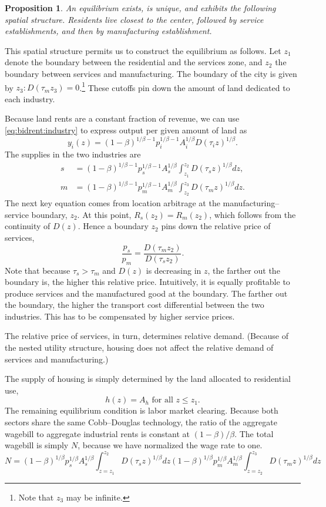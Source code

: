 \documentclass[12pt]{article}
\newtheorem{proposition}{Proposition}
\begin{document}
\begin{proposition}\label{prop:spatial}
An equilibrium exists, is unique, and exhibits the following spatial structure. Residents live closest to the center, followed by service establishments, and then by manufacturing establishment.
\end{proposition}

This spatial structure permits us to construct the equilibrium as follows. Let $z_1$ denote the boundary between the residential and the services zone, and $z_2$ the boundary between services and manufacturing. The boundary of the city is given by $z_3: D(\tau_m z_3)=0$.\footnote{Note that $z_3$ may be infinite.} These cutoffs pin down the amount of land dedicated to each industry.

Because land rents are a constant fraction of revenue, we can use \eqref{eq:bidrent:industry} to express output per given amount of land as
\[
y_i(z) = (1-\beta)^{1/\beta-1} p_i^{1/\beta-1} A_i^{1/\beta} D(\tau_i z)^{1/\beta}.
\]
The supplies in the two industries are
\begin{align}
s &= (1-\beta)^{1/\beta-1} p_s^{1/\beta-1} A_s^{1/\beta} \int_{z_1}^{z_2}D(\tau_s z)^{1/\beta} dz,\label{eq:supply:s} \\
m&= (1-\beta)^{1/\beta-1} p_m^{1/\beta-1} A_m^{1/\beta} \int_{z_2}^{z_3}D(\tau_m z)^{1/\beta} dz.\label{eq:supply:m}
\end{align}
The next key equation comes from location arbitrage at the manufacturing--service boundary, $z_2$. At this point, $R_s(z_2)=R_m(z_2)$, which follows from the continuity of $D(z)$. Hence a boundary $z_2$ pins down the relative price of services,
\begin{equation}\label{eq:arbitrage}
\frac{p_s}{p_m} = \frac{D(\tau_m z_2)}{D(\tau_s z_2)}.
\end{equation}
Note that because $\tau_s>\tau_m$ and $D(z)$ is decreasing in $z$, the farther out the boundary is, the higher this relative price. Intuitively, it is equally profitable to produce services and the manufactured good at the boundary. The farther out the boundary, the higher the transport cost differential between the two industries. This has to be compensated by higher service prices.

The relative price of services, in turn, determines relative demand. (Because of the nested utility structure, housing does not affect the relative demand of services and manufacturing.)

The supply of housing is simply determined by the land allocated to residential use,
\[
h(z) = A_h\text{ for all }z\le z_1.
\]
The remaining equilibrium condition is labor market clearing. Because both sectors share the same Cobb--Douglas technology, the ratio of the aggregate wagebill to aggregate industrial rents is constant at $(1-\beta)/\beta$. The total wagebill is simply $N$, because we have normalized the wage rate to one. 
\begin{equation}\label{eq:labormarket}
N = 
(1-\beta)^{1/\beta} p_s^{1/\beta} A_s^{1/\beta} \int_{z=z_1}^{z_2}D(\tau_s z)^{1/\beta}dz
(1-\beta)^{1/\beta} p_m^{1/\beta} A_m^{1/\beta} \int_{z=z_2}^{z_3}D(\tau_m z)^{1/\beta}dz
\end{equation}
\end{document}
